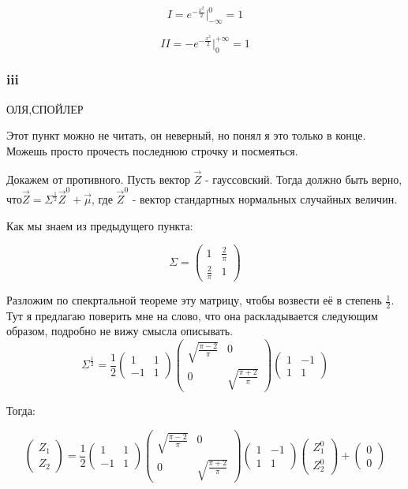 \documentclass[a4paper,12pt]{article}
\begin{document}
\[ I = e^{-\frac{x^2}{2}}\Biggr|_{-\infty}^{0}   = 1 \]

\[ II = -e^{-\frac{x^2}{2}}\Biggr|_0^{+\infty} = 1  \]



\subsubsection{iii}

ОЛЯ,СПОЙЛЕР

Этот пункт можно не читать, он неверный, но понял я это только в конце. Можешь просто прочесть последнюю строчку и посмеяться.

Докажем от противного. Пусть вектор $ \vec{Z} $ - гауссовский. Тогда  должно быть верно, что$  \vec{Z} = \Sigma^{\frac{1}{2}} \vec{Z}^0 + \vec{\mu} $, где  $ \vec{Z}^0 $  - вектор стандартных нормальных случайных величин.

Как мы знаем из предыдущего пункта:

\[ \Sigma = \begin{pmatrix}
1 & \frac{2}{\pi}\\
 \frac{2}{\pi} & 1
\end{pmatrix} \]

Разложим по спекртальной теореме эту матрицу, чтобы возвести её в степень $ \frac{1}{2} $. Тут я предлагаю поверить мне на слово, что она раскладывается следующим образом, подробно не вижу смысла описывать. 
\[ 
 \Sigma^{\frac{1}{2}} = \frac{1}{2}\begin{pmatrix}
	1 & 1\\
	-1 & 1
\end{pmatrix} 
\begin{pmatrix}
\sqrt{\frac{\pi - 2}{\pi}} & 0\\
0 & \sqrt{\frac{\pi + 2}{\pi}}
\end{pmatrix}
\begin{pmatrix}
1 & -1\\
1 & 1
\end{pmatrix} 
 \]

Тогда:

\[ \begin{pmatrix}
Z_1\\
Z_2
\end{pmatrix} = \frac{1}{2}\begin{pmatrix}
1 & 1\\
-1 & 1
\end{pmatrix} 
\begin{pmatrix}
\sqrt{\frac{\pi - 2}{\pi}} & 0\\
0 & \sqrt{\frac{\pi + 2}{\pi}}
\end{pmatrix}
\begin{pmatrix}
1 & -1\\
1 & 1
\end{pmatrix}  \begin{pmatrix}
Z_1^0\\
Z_2^0
\end{pmatrix} +    \begin{pmatrix}
0\\
0
\end{pmatrix} \]
\end{document}
